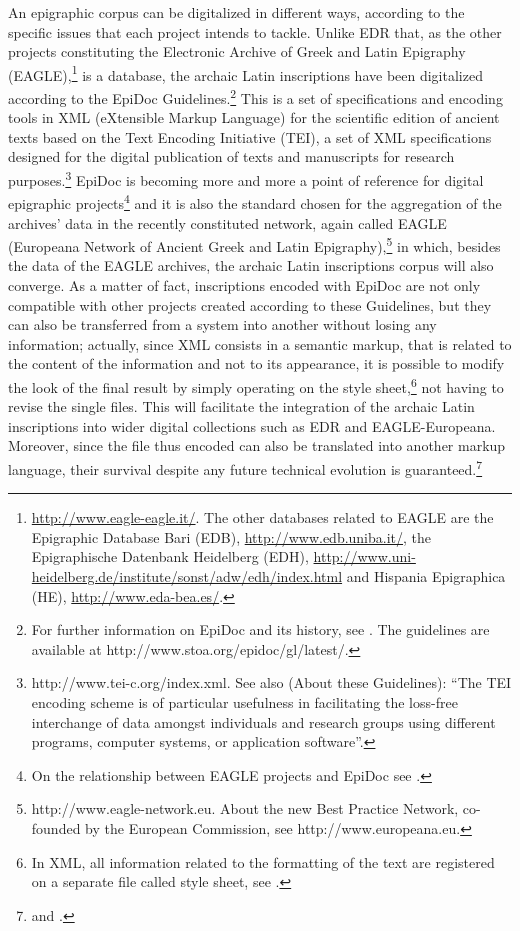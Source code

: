 \documentclass[amsthm,ebook]{saparticle}
\begin{document}
\noindent An epigraphic corpus can be digitalized in different ways, according to the specific issues that each project intends to
tackle. Unlike EDR that, as the other projects constituting the Electronic Archive of Greek and Latin Epigraphy
(EAGLE),\footnote{\url{http://www.eagle-eagle.it/}. The other databases related to EAGLE are the Epigraphic Database Bari
(EDB), \url{http://www.edb.uniba.it/}, the Epigraphische Datenbank Heidelberg (EDH),
\url{http://www.uni-heidelberg.de/institute/sonst/adw/edh/index.html} and Hispania Epigraphica (HE),
\url{http://www.eda-bea.es/}.} is a database, the archaic Latin inscriptions have been digitalized according to the EpiDoc
Guidelines.\footnote{For further information on EpiDoc and its history, see \citet{elliott_epidoc_2007}.
The guidelines are available at http://www.stoa.org/epidoc/gl/latest/.} This is a set of specifications and encoding
tools in XML (eXtensible Markup Language) for the scientific edition of ancient texts based on the Text Encoding
Initiative (TEI), a set of XML specifications designed for the digital publication of texts and manuscripts for
research purposes.\footnote{http://www.tei-c.org/index.xml. See also \citet{consortium_tei_2008} (About these Guidelines):
“The TEI encoding scheme is of particular usefulness in facilitating the loss-free interchange of data amongst
individuals and research groups using different programs, computer systems, or application software”.} EpiDoc is
becoming more and more a point of reference for digital epigraphic projects\footnote{On the relationship between EAGLE
projects and EpiDoc see \citet{felle_esperienze_2012}.} and it is also the standard chosen for the aggregation of the archives' data in
the recently constituted network, again called EAGLE (Europeana Network of Ancient Greek and Latin
Epigraphy),\footnote{http://www.eagle-network.eu. About the new Best Practice Network, co-founded by the European
Commission, see http://www.europeana.eu.} in which, besides the data of the EAGLE archives, the archaic Latin
inscriptions corpus will also converge. As a matter of fact, inscriptions encoded with EpiDoc are not only compatible
with other projects created according to these Guidelines, but they can also be transferred from a system into another
without losing any information; actually, since XML consists in a semantic markup, that is related to the content of
the information and not to its appearance, it is possible to modify the look of the final result by simply operating on
the style sheet,\footnote{In XML, all information related to the formatting of the text are registered on a separate
file called style sheet, see \citet[104, 110-111]{bodard_epidoc:_2009}.} not having to revise the single files. This will facilitate
the integration of the archaic Latin inscriptions into wider digital collections such as EDR and EAGLE-Europeana.
Moreover, since the file thus encoded can also be translated into another markup language, their survival despite any
future technical evolution is guaranteed.\footnote{\citet[37-38]{tissoni_epidoc_2008} and \citet[104-105]{bodard_epidoc:_2009}.}
\end{document}
